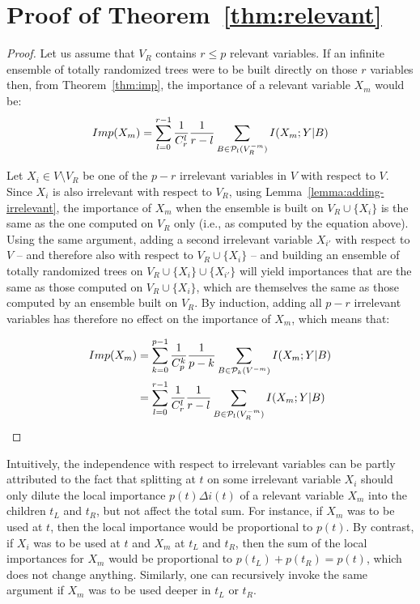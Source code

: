 \documentclass{article}
\begin{document}

\section{Proof of Theorem~\ref{thm:relevant}}
\label{app:thm:relevant}

\begin{proof}
Let us assume that $V_R$ contains $r \leq p$ relevant variables. If an infinite
ensemble of totally randomized trees were to be built directly on those $r$
variables then, from Theorem~\ref{thm:imp}, the importance of a relevant
variable $X_m$ would be:
\begin{equation*}%
  Imp(X_m)=\sum_{l=0}^{r-1} \frac{1}{C_r^l} \frac{1}{r-l} \sum_{B \in {\cal P}_l(V_R^{-m})} I(X_m;Y|B)
\end{equation*}

Let $X_i \in V \setminus V_R$ be one of the $p-r$ irrelevant variables in $V$
with respect to $V$. Since $X_i$ is also irrelevant with respect to $V_R$, using
Lemma~\ref{lemma:adding-irrelevant}, the importance of $X_m$ when the ensemble
is built on $V_R \cup \{X_i\}$ is the same as the one computed on $V_R$ only
(i.e., as computed by the equation above). Using the same argument,
adding a second irrelevant variable $X_{i'}$ with respect to $V$ -- and therefore
also with respect to $V_R \cup \{X_i\}$ -- and building an ensemble of totally
randomized trees on $V_R \cup \{X_i\} \cup \{X_{i'}\}$ will yield importances
that are the same as those computed on $V_R \cup \{X_i\}$, which are themselves
the same as those computed by an ensemble built on $V_R$. By induction, adding
all $p-r$ irrelevant variables has therefore no effect on the importance of
$X_m$, which means that:

\begin{equation*}%
  \begin{aligned}
  Imp(X_m)&=\sum_{k=0}^{p-1} \frac{1}{C_p^k} \frac{1}{p-k} \sum_{B \in {\cal P}_k(V^{-m})} I(X_m;Y|B)\\
          &=\sum_{l=0}^{r-1} \frac{1}{C_r^l} \frac{1}{r-l} \sum_{B \in {\cal P}_l(V_R^{-m})} I(X_m;Y|B)\\
  \end{aligned}
\end{equation*}
\end{proof}

Intuitively, the independence with respect to irrelevant variables can be partly
attributed to the fact that splitting at $t$ on some irrelevant variable $X_i$
should only dilute the local importance $p(t) \Delta i(t)$ of a relevant
variable $X_m$ into the children $t_L$ and $t_R$, but not affect the total sum.
For instance, if $X_m$ was to be used at $t$, then the local importance would be
proportional to $p(t)$. By contrast, if $X_i$ was to be used at $t$ and $X_m$ at
$t_L$ and $t_R$, then the sum of the local importances for $X_m$ would be
proportional to $p(t_L) + p(t_R)=p(t)$, which does not change anything.
Similarly, one can recursively invoke the same argument if $X_m$ was to be used
deeper in $t_L$ or $t_R$.
\end{document}
